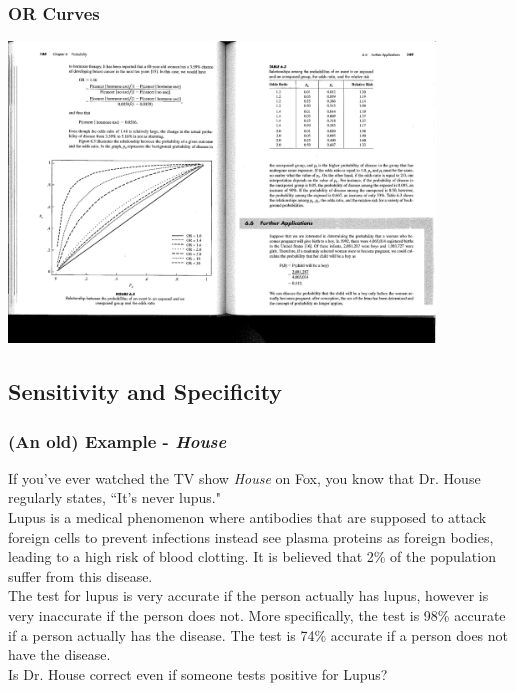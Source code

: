 
\begin{frame}
\frametitle{OR Curves}

\vspace{-5mm}

\begin{center}
\includegraphics[width=0.85\textwidth]{8-4_logistic_reg/figures/all_OR.pdf}
\end{center}

\end{frame}


\subsection{Sensitivity and Specificity}


\begin{frame}
\frametitle{(An old) Example - \emph{House}}

If you've ever watched the TV show \emph{House} on Fox, you know that Dr. House regularly states, ``It's never lupus." \\
\vspace{3mm}
Lupus is a medical phenomenon where antibodies that are supposed to attack foreign cells to prevent infections instead see plasma proteins as foreign bodies, leading to a high risk of blood clotting. It is believed that 2\% of the population suffer from this disease. \\
\vspace{3mm}
The test for lupus is very accurate if the person actually has lupus, however is very inaccurate if the person does not. More specifically, the test is 98\% accurate if a person actually has the disease. The test is 74\% accurate if a person does not have the disease. \\
\vspace{3mm}
Is Dr. House correct even if someone tests positive for Lupus? 

\end{frame}

